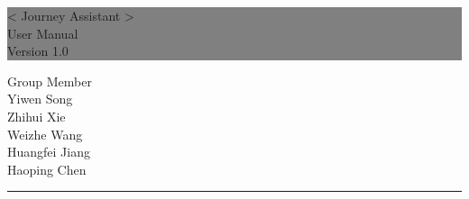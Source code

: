 \documentclass[10pt]{article}
\begin{document}

\begin{titlepage} %
	
	
	\colorbox{grey}{
		\parbox[t]{1.1\textwidth}{ %
			\parbox[t]{1.02\textwidth}{ %
				\raggedleft %
				\fontsize{34pt}{40pt}\selectfont %
				\vspace{0.7cm} %
				
				< Journey Assistant >\\
                User Manual\\
                Version 1.0\\
				
				\vspace{0.7cm} %
			}
		}
	}
	
	\vfill %
	
	
	\parbox[t]{1\textwidth}{ %
		\raggedleft %
		\large %
		{\Large Group Member}\\[4pt] %
        Yiwen Song\\
        Zhihui Xie\\
        Weizhe Wang\\
        Huangfei Jiang\\
        Haoping Chen\\
		
		\hfill\rule{0.2\linewidth}{1pt}%
    }
    
	
\end{titlepage}
\end{document}
